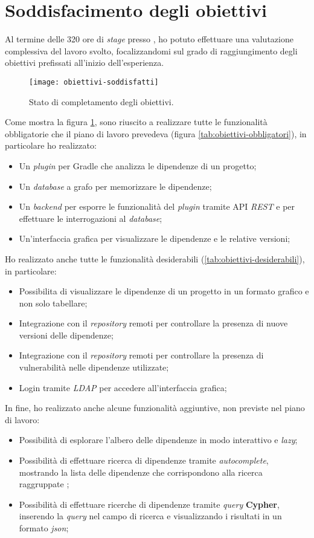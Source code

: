 \section{Soddisfacimento degli obiettivi}
Al termine delle 320 ore di \textit{stage} presso \azienda{}, ho potuto effettuare una valutazione complessiva del lavoro svolto, 
focalizzandomi sul grado di raggiungimento degli obiettivi prefissati all'inizio dell'esperienza.

\begin{figure}[!h] 
  \centering 
  \texttt{[image: obiettivi-soddisfatti]} 
  \caption{Stato di completamento degli obiettivi.}
  \label{fig:obiettivi-soddisfatti}
\end{figure}

Come mostra la figura \ref{fig:obiettivi-soddisfatti}, sono riuscito a realizzare tutte le funzionalità obbligatorie che il piano di lavoro prevedeva (figura \ref{tab:obiettivi-obbligatori}),
in particolare ho realizzato:
\begin{itemize}
 \item Un \textit{plugin} per Gradle che analizza le dipendenze di un progetto;
 \item Un \textit{database} a grafo per memorizzare le dipendenze;
 \item Un \textit{backend} per esporre le funzionalità del \textit{plugin} tramite API \textit{REST} e per effettuare le interrogazioni al \textit{database};
 \item Un'interfaccia grafica per visualizzare le dipendenze e le relative versioni;
\end{itemize}

Ho realizzato anche tutte le funzionalità desiderabili (\ref{tab:obiettivi-desiderabili}), in particolare:
\begin{itemize}
\item Possibilita di visualizzare le dipendenze di un progetto in un formato grafico e non solo tabellare;
\item Integrazione con il \textit{repository} remoti per controllare la presenza di nuove versioni delle dipendenze;
\item Integrazione con il \textit{repository} remoti per controllare la presenza di vulnerabilità nelle dipendenze utilizzate;
\item Login tramite \textit{LDAP} per accedere all'interfaccia grafica;
\end{itemize}

In fine, ho realizzato anche alcune funzionalità aggiuntive, non previste nel piano di lavoro:
\begin{itemize}
  \item Possibilità di esplorare l'albero delle dipendenze in modo interattivo e \textit{lazy};
  \item Possibilità di effettuare ricerca di dipendenze tramite \textit{autocomplete}, mostrando la lista delle dipendenze che corrispondono alla ricerca raggruppate ;
  \item Possibilità di effettuare ricerche di dipendenze tramite \textit{query} \textbf{Cypher}, inserendo la \textit{query} nel campo di ricerca e visualizzando i risultati in un formato \textit{json};
\end{itemize}

